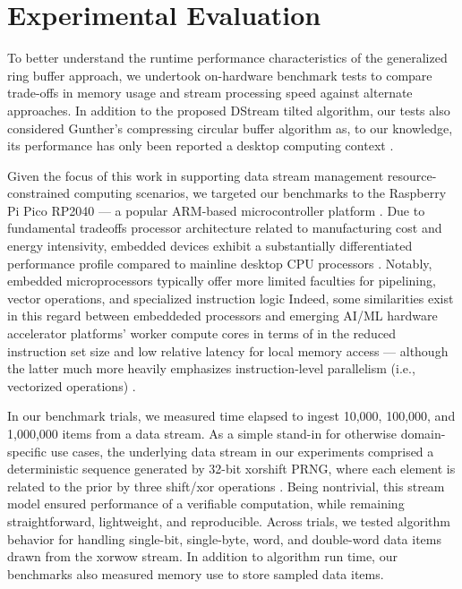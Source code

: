 \section{Experimental Evaluation}
\label{sec:performance}

To better understand the runtime performance characteristics of the generalized ring buffer approach, we undertook on-hardware benchmark tests to compare trade-offs in memory usage and stream processing speed against alternate approaches.
In addition to the proposed DStream tilted algorithm, our tests also considered Gunther's compressing circular buffer algorithm as, to our knowledge, its performance has only been reported a desktop computing context \citep{gunther2014compressing}.

Given the focus of this work in supporting data stream management resource-constrained computing scenarios, we targeted our benchmarks to the Raspberry Pi Pico RP2040 --- a popular ARM-based microcontroller platform \citep{raspberrypipico2024}.
Due to fundamental tradeoffs processor architecture related to manufacturing cost and energy intensivity, embedded devices exhibit a substantially differentiated performance profile compared to mainline desktop CPU processors \citep{schlett2000embedded}.
Notably, embedded microprocessors typically offer more limited faculties for pipelining, vector operations, and specialized instruction logic  \citep{yiu2015definitive}
Indeed, some similarities exist in this regard between embeddeded processors and emerging AI/ML hardware accelerator platforms' worker compute cores in terms of in the reduced instruction set size and low relative latency for local memory access --- although the latter much more heavily emphasizes instruction-level parallelism (i.e., vectorized operations)
\citep{lie2023cerebras} \citep{vasiljevic2021compute}.

In our benchmark trials, we measured time elapsed to ingest 10,000, 100,000, and 1,000,000 items from a data stream.
As a simple stand-in for otherwise domain-specific use cases, the underlying data stream in our experiments comprised a deterministic sequence generated by 32-bit xorshift PRNG, where each element is related to the prior by three shift/xor operations \citep{marsaglia2003xorshift}.
Being nontrivial, this stream model ensured performance of a verifiable computation, while remaining straightforward, lightweight, and reproducible.
Across trials, we tested algorithm behavior for handling single-bit, single-byte, word, and double-word data items drawn from the xorwow stream.
In addition to algorithm run time, our benchmarks also measured memory use to store sampled data items.

